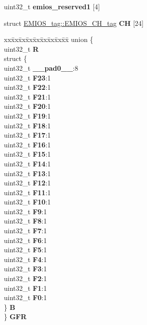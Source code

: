 \begin{DoxyCompactItemize}
\begin{tabbing}
\end{tabbing}\item 
\mbox{\label{structEMIOS__tag_ae83f602dcdc8948cefa5da0cf35c35f0}} 
uint32\+\_\+t {\bfseries emios\+\_\+reserved1} \mbox{[}4\mbox{]}
\item 
\mbox{\label{structEMIOS__tag_a8326b9c2996d1355161bdc8f37555556}} 
struct \mbox{\hyperlink{structEMIOS__tag_1_1EMIOS__CH__tag}{E\+M\+I\+O\+S\+\_\+tag\+::\+E\+M\+I\+O\+S\+\_\+\+C\+H\+\_\+tag}} {\bfseries CH} \mbox{[}24\mbox{]}
\item 
\mbox{\label{structEMIOS__tag_a71b62ddf5e00955ab7c8156f519c06ec}} 
\begin{tabbing}
xx\=xx\=xx\=xx\=xx\=xx\=xx\=xx\=xx\=\kill
union \{\\
\>uint32\_t {\bfseries R}\\
\>struct \{\\
\>\>uint32\_t {\bfseries \_\_pad0\_\_}:8\\
\>\>uint32\_t {\bfseries F23}:1\\
\>\>uint32\_t {\bfseries F22}:1\\
\>\>uint32\_t {\bfseries F21}:1\\
\>\>uint32\_t {\bfseries F20}:1\\
\>\>uint32\_t {\bfseries F19}:1\\
\>\>uint32\_t {\bfseries F18}:1\\
\>\>uint32\_t {\bfseries F17}:1\\
\>\>uint32\_t {\bfseries F16}:1\\
\>\>uint32\_t {\bfseries F15}:1\\
\>\>uint32\_t {\bfseries F14}:1\\
\>\>uint32\_t {\bfseries F13}:1\\
\>\>uint32\_t {\bfseries F12}:1\\
\>\>uint32\_t {\bfseries F11}:1\\
\>\>uint32\_t {\bfseries F10}:1\\
\>\>uint32\_t {\bfseries F9}:1\\
\>\>uint32\_t {\bfseries F8}:1\\
\>\>uint32\_t {\bfseries F7}:1\\
\>\>uint32\_t {\bfseries F6}:1\\
\>\>uint32\_t {\bfseries F5}:1\\
\>\>uint32\_t {\bfseries F4}:1\\
\>\>uint32\_t {\bfseries F3}:1\\
\>\>uint32\_t {\bfseries F2}:1\\
\>\>uint32\_t {\bfseries F1}:1\\
\>\>uint32\_t {\bfseries F0}:1\\
\>\} {\bfseries B}\\
\} {\bfseries GFR}\\


\end{tabbing}
\end{DoxyCompactItemize}
